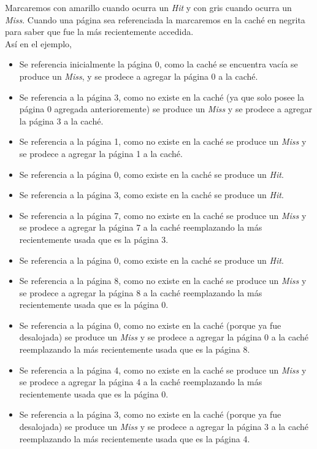 \documentclass[11pt, a4paper, spanish]{article}
\begin{document}
Marcaremos con amarillo cuando ocurra un \textit{Hit} y con gris cuando ocurra un \textit{Miss}.
Cuando una p\'agina sea referenciada la marcaremos en la cach\'e en negrita para saber que fue la m\'as recientemente accedida.\\

As\'i en el ejemplo, 

\begin{itemize}
	\item{ Se referencia inicialmente la p\'agina 0, como la cach\'e se encuentra vac\'ia se produce un \textit{Miss}, y se prodece a agregar
		la p\'agina 0 a la cach\'e.}
	\item{ Se referencia a la p\'agina 3, como no existe en la cach\'e (ya que solo posee la p\'agina 0 agregada anterioremente) se produce 
		un \textit{Miss} y se prodece a agregar la p\'agina 3 a la cach\'e.}
	\item{ Se referencia a la p\'agina 1, como no existe en la cach\'e se produce un \textit{Miss} y se prodece a agregar la p\'agina 1 a la cach\'e.}
	\item{ Se referencia a la p\'agina 0, como existe en la cach\'e se produce un \textit{Hit}. }
	\item{ Se referencia a la p\'agina 3, como existe en la cach\'e se produce un \textit{Hit}. }
	\item{ Se referencia a la p\'agina 7, como no existe en la cach\'e se produce un \textit{Miss} y se prodece a agregar la p\'agina 7 a la cach\'e
		reemplazando la m\'as recientemente usada que es la p\'agina 3. }
	\item{ Se referencia a la p\'agina 0, como existe en la cach\'e se produce un \textit{Hit}. }
	\item{ Se referencia a la p\'agina 8, como no existe en la cach\'e se produce un \textit{Miss} y se prodece a agregar la p\'agina 8 a la cach\'e
		reemplazando la m\'as recientemente usada que es la p\'agina 0. }
	\item{ Se referencia a la p\'agina 0, como no existe en la cach\'e (porque ya fue desalojada) se produce un \textit{Miss} y se prodece a agregar 
		la p\'agina 0 a la cach\'e reemplazando la m\'as recientemente usada que es la p\'agina 8. }
	\item{ Se referencia a la p\'agina 4, como no existe en la cach\'e se produce un \textit{Miss} y se prodece a agregar 
		la p\'agina 4 a la cach\'e reemplazando la m\'as recientemente usada que es la p\'agina 0. }
	\item{ Se referencia a la p\'agina 3, como no existe en la cach\'e (porque ya fue desalojada) se produce un \textit{Miss} y se prodece a agregar 
		la p\'agina 3 a la cach\'e reemplazando la m\'as recientemente usada que es la p\'agina 4. }
\end{itemize}
\end{document}
